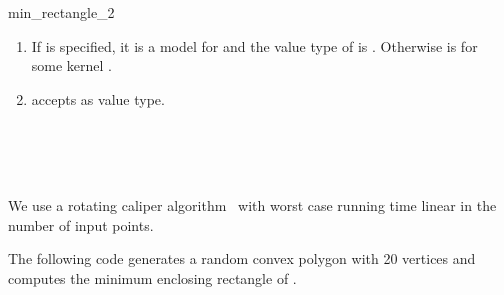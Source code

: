 \begin{ccRefFunction}{min_rectangle_2}
  \ccRequire
  \begin{enumerate}
  \item If  is specified, it is a model for
     and the value type  of
     is . Otherwise 
    is  for some kernel .
  \item {} accepts  as value type.
  \end{enumerate}
  
  \ccSeeAlso
  \\
  \\
  \\
  
  \ccImplementation We use a rotating caliper
   algorithm~\cite{t-sgprc-83}
  with worst case running time linear in the number of input points.
  
  \ccExample The following code generates a random convex polygon
   with 20 vertices and computes the minimum enclosing
  rectangle of .


\end{ccRefFunction}
    
